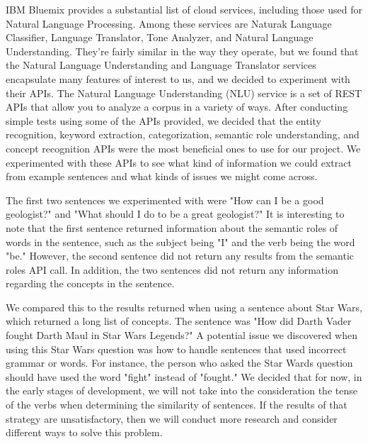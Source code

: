 \documentclass{sig-alternate}
\begin{document}
IBM Bluemix provides a substantial list of cloud services, including those used for Natural Language Processing. Among these services are Naturak Language Classifier, Language Translator, Tone Analyzer, and Natural Language Understanding. They're fairly similar in the way they operate, but we found that the Natural Language Understanding and Language Translator services encapsulate many features of interest to us, and we decided to experiment with their APIs. The Natural Language Understanding (NLU) service is a set of REST APIs that allow you to analyze a corpus in a variety of ways. After conducting simple tests using some of the APIs provided, we decided that the entity recognition, keyword extraction, categorization, semantic role understanding, and concept recognition APIs were the most beneficial ones to use for our project. We experimented with these APIs to see what kind of information we could extract from example sentences and what kinds of issues we might come across.

The first two sentences we experimented with were "How can I be a good geologist?" and "What should I do to be a great geologist?" It is interesting to note that the first sentence returned information about the semantic roles of words in the sentence, such as the subject being "I" and the verb being the word "be." However, the second sentence did not return any results from the semantic roles API call. In addition, the two sentences did not return any information regarding the concepts in the sentence.

We compared this to the results returned when using a sentence about Star Wars, which returned a long list of concepts. The sentence was "How did Darth Vader fought Darth Maul in Star Wars Legends?" A potential issue we discovered when using this Star Wars question was how to handle sentences that used incorrect grammar or words. For instance, the person who asked the Star Wards question should have used the word "fight" instead of "fought." We decided that for now, in the early stages of development, we will not take into the consideration the tense of the verbs when determining the similarity of sentences. If the results of that strategy are unsatisfactory, then we will conduct more research and consider different ways to solve this problem.
\end{document}
